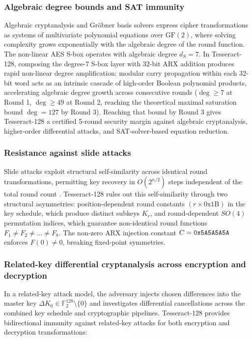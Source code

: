 \documentclass[10pt,twocolumn]{article}
\begin{document}
\subsubsection{Algebraic degree bounds and SAT immunity}
Algebraic cryptanalysis and Gr\"{o}bner basis solvers express cipher transformations as systems of multivariate polynomial equations over $\text{GF}(2)$, where solving complexity grows exponentially with the algebraic degree of the round function. The non-linear AES S-box operates with algebraic degree $d_S = 7$. In Tesseract-128, composing the degree-7 S-box layer with 32-bit ARX addition produces rapid non-linear degree amplification: modular carry propagation within each 32-bit word acts as an intrinsic cascade of high-order Boolean polynomial products, accelerating algebraic degree growth across consecutive rounds ($\deg \ge 7$ at Round 1, $\deg \ge 49$ at Round 2, reaching the theoretical maximal saturation bound $\deg = 127$ by Round 3). Reaching that bound by Round 3 gives Tesseract-128 a certified 5-round security margin against algebraic cryptanalysis, higher-order differential attacks, and SAT-solver-based equation reduction.

\subsubsection{Resistance against slide attacks}
Slide attacks exploit structural self-similarity across identical round transformations, permitting key recovery in $O(2^{n/2})$ steps independent of the total round count \cite{biryukov1999slide, biryukov2000slide}. Tesseract-128 rules out this self-similarity through two structural asymmetries: position-dependent round constants $(r \times \text{0x1B})$ in the key schedule, which produce distinct subkeys $K_r$, and round-dependent $SO(4)$ permutation indices, which guarantee non-identical round functions $F_1 \neq F_2 \neq \dots \neq {}\allowbreak F_8$. The non-zero ARX injection constant $C = \text{\texttt{0x5A5A5A5A}}$ enforces $F(0) \neq 0$, breaking fixed-point symmetries.

\subsubsection{Related-key differential cryptanalysis across encryption and decryption}
\label{subsec:related_key}
In a related-key attack model, the adversary injects chosen differences into the master key $\Delta K_0 \in \mathbb{F}_2^{128} \setminus \{0\}$ and investigates differential cancellations across the combined key schedule and cryptographic pipelines. Tesseract-128 provides bidirectional immunity against related-key attacks for both encryption and decryption transformations:
\end{document}
